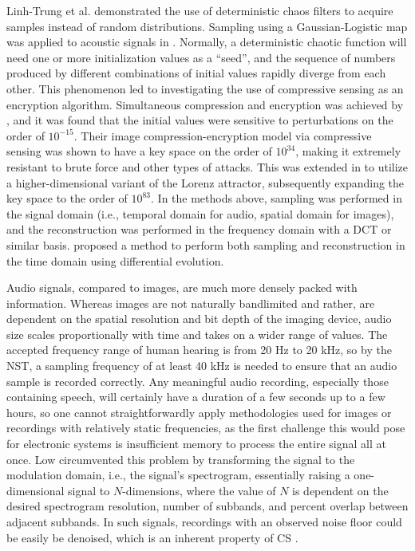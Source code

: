 Linh-Trung et al. \cite{LinhTrung2008} demonstrated the use of deterministic chaos filters to acquire samples instead of random distributions. Sampling using a Gaussian-Logistic map was applied to acoustic signals in \cite{Mathew2016}. Normally, a deterministic chaotic function will need one or more initialization values as a ``seed'', and the sequence of numbers produced by different combinations of initial values rapidly diverge from each other. This phenomenon led to investigating the use of compressive sensing as an encryption algorithm. Simultaneous compression and encryption was achieved by \cite{Mo2013}, and it was found that the initial values were sensitive to perturbations on the order of $10^{-15}$. Their image compression-encryption model via compressive sensing was shown to have a key space on the order of $10^{34}$, making it extremely resistant to brute force and other types of attacks. This was extended in \cite{Zhou2016} to utilize a higher-dimensional variant of the Lorenz attractor, subsequently expanding the key space to the order of $10^{83}$. In the methods above, sampling was performed in the signal domain (i.e., temporal domain for audio, spatial domain for images), and the reconstruction was performed in the frequency domain with a DCT or similar basis. \cite{Andras2018} proposed a method to perform both sampling and reconstruction in the time domain using differential evolution.

Audio signals, compared to images, are much more densely packed with information. Whereas images are not naturally bandlimited and rather, are dependent on the spatial resolution and bit depth of the imaging device, audio size scales proportionally with time and takes on a wider range of values. The accepted frequency range of human hearing is from 20 Hz to 20 kHz, so by the NST, a sampling frequency of at least 40 kHz is needed to ensure that an audio sample is recorded correctly. Any meaningful audio recording, especially those containing speech, will certainly have a duration of a few seconds up to a few hours, so one cannot straightforwardly apply methodologies used for images or recordings with relatively static frequencies, as the first challenge this would pose for electronic systems is insufficient memory to process the entire signal all at once. Low \cite{Low2013,Low2018} circumvented this problem by transforming the signal to the modulation domain, i.e., the signal's spectrogram, essentially raising a one-dimensional signal to $N$-dimensions, where the value of $N$ is dependent on the desired spectrogram resolution, number of subbands, and percent overlap between adjacent subbands. In such signals, recordings with an observed noise floor could be easily be denoised, which is an inherent property of CS \cite{Dabov2007}.


